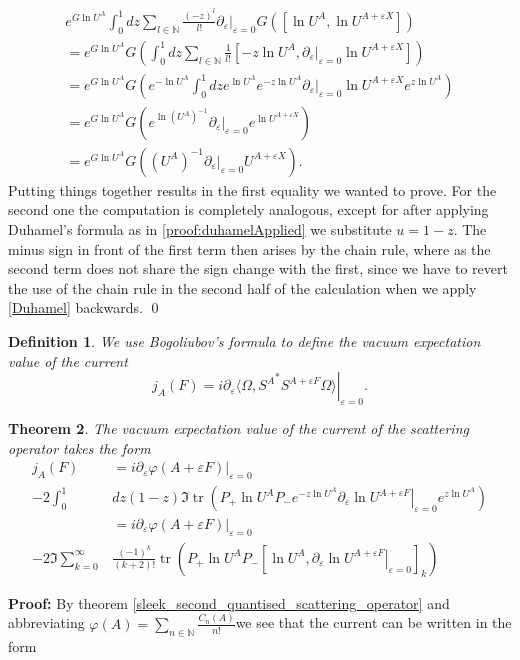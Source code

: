 \documentclass[b5paper,draft,openbib,12pt]{memoir}
\newtheorem{Def}{Definition}[section]
\newtheorem{Thm}[Def]{Theorem}
\DeclareMathOperator{\tr}{tr}
\begin{document}
\begin{multline}
e^{G \ln U^A} \int_0^1 d z \sum_{l\in\mathbb{N}} \frac{(-z)^l}{l!} \partial_\varepsilon |_{\varepsilon=0} G\left(\left[ \ln U^A, \ln U^{A+\varepsilon X}\right]\right) \\
=e^{G \ln U^A}  G\left( \int_0^1 d z \sum_{l\in\mathbb{N}} \frac{1}{l!}  \left[ -z \ln U^A,\partial_\varepsilon|_{\varepsilon=0} \ln U^{A+\varepsilon X}\right]\right) \\
=e^{G \ln U^A}  G\left(e^{- \ln U^A} \int_0^1 d z e^{ \ln U^A} e^{-z \ln U^A}\partial_\varepsilon|_{\varepsilon=0} \ln U^{A+\varepsilon X} e^{z \ln U^A}\right) \\
=e^{G \ln U^A}  G\left(e^{ \ln \left(U^A\right)^{-1}} \partial_\varepsilon|_{\varepsilon=0} e^{ \ln U^{A+\varepsilon X}} \right) \\
=e^{G \ln U^A}  G\left(\left(U^A\right)^{-1} \partial_\varepsilon|_{\varepsilon=0}U^{A+\varepsilon X} \right).
\end{multline}
Putting things together results in the first equality we wanted to prove. For the second one the computation is completely analogous, except for after applying Duhamel's formula as in \eqref{proof:duhamelApplied} we substitute \(u=1-z\). The minus sign in front of the first term then arises by the chain rule, where as the second term does not share the sign change with the first, since we have to revert the use of the chain rule in the second half of the calculation when we apply  \eqref{Duhamel} backwards. \qed

\begin{Def}
We use Bogoliubov's formula to define the vacuum expectation value of the current 
\begin{equation}
j_A(F) = i \partial_{\varepsilon}\left. \langle \Omega, {S^{A} }^* S^{A+\varepsilon F}\Omega \rangle \right|_{\varepsilon=0}.
\end{equation}
\end{Def}



\begin{Thm}\label{thm:CurrentExact}
The vacuum expectation value of the current of the scattering operator takes the form
\begin{align*}
j_A(F)&=i \partial_{\varepsilon} \left. \varphi(A+\varepsilon F) \right|_{\varepsilon=0}\\
-2\int_0^1 &d z (1-z)  \Im \tr\left(P_+ \ln U^A P_- e^{ -z \ln U^A} \partial_{\varepsilon} \left. \ln U^{A+\varepsilon F}\right|_{\varepsilon=0} e^{ z \ln U^A}\right)\\
&=i \partial_{\varepsilon} \left.\varphi(A+\varepsilon F) \right|_{\varepsilon=0}\\
  - 2\Im \sum_{k=0}^\infty&\frac{(-1)^k}{(k+2)!}  \tr \left( P_+ \ln U^A P_-\left[\ln U^A,\left.\partial_{\varepsilon}\ln U^{A+\varepsilon F} \right|_{\varepsilon=0}\right]_{k}\right) 
\end{align*}
\end{Thm}
\textbf{Proof:} By theorem \ref{sleek_second_quantised_scattering_operator} and abbreviating
\(\varphi(A)= \sum_{n\in\mathbb{N}} \frac{C_n(A)}{n!} \)we see that the current can be written in the form
\end{document}
